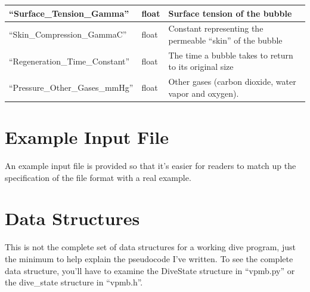 \documentclass[12pt]{article}
\begin{document}
\begin{longtable}{|l|l|p{5cm}|}
\hline
 ``Surface\_Tension\_Gamma''           &  float                                                                                            &  Surface tension of the bubble                                                            \\
\hline
 ``Skin\_Compression\_GammaC''         &  float                                                                                            &  Constant representing the permeable ``skin'' of the bubble                                               \\
\hline
 ``Regeneration\_Time\_Constant''      &  float                                                                                            &  The time a bubble takes to return to its original size                   \\
\hline
 ``Pressure\_Other\_Gases\_mmHg''      &  float                                                                                            &  Other gases (carbon dioxide, water vapor and oxygen).                                    \\
\hline
\end{longtable}

\newpage
\section{Example Input File}

An example input file is provided so that it's easier for readers to match up
the specification of the file format with a real example.

\label{inputfile}


\newpage
\section{Data Structures}

This is not the complete set of data structures for a working dive program, just the minimum to help explain the
pseudocode I've written. To see the complete data structure, you'll have to examine the DiveState structure
in ``vpmb.py'' or the dive\_state structure in ``vpmb.h''.
\end{document}
